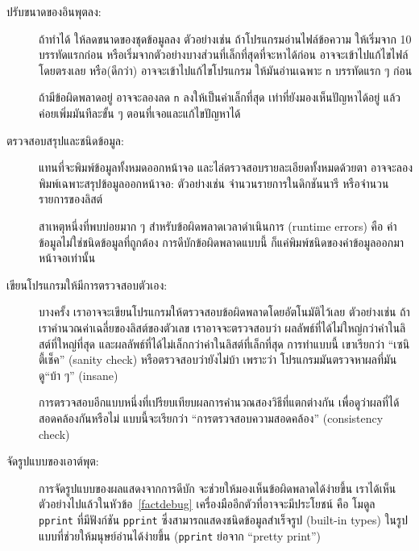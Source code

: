 \begin{description}

\item[ปรับขนาดของอินพุตลง:] 
ถ้าทำได้ ให้ลดขนาดของชุดข้อมูลลง
ตัวอย่างเช่น ถ้าโปรแกรมอ่านไฟล์ข้อความ
ให้เริ่มจาก 10 บรรทัดแรกก่อน หรือเริ่มจากตัวอย่างบางส่วนที่เล็กที่สุดที่จะหาได้ก่อน
อาจจะเข้าไปแก้ไขไฟล์โดยตรงเลย หรือ(ดีกว่า) อาจจะเข้าไปแก้ไขโปรแกรม ให้มันอ่านเฉพาะ \texttt{n} บรรทัดแรก ๆ ก่อน 

ถ้ามีข้อผิดพลาดอยู่ อาจจะลองลด \texttt{n} ลงให้เป็นค่าเล็กที่สุด เท่าที่ยังมองเห็นปัญหาได้อยู่
แล้วค่อยเพิ่มมันทีละขั้น ๆ ตอนที่เจอและแก้ไขปัญหาได้

\item[ตรวจสอบสรุปและชนิดข้อมูล:] 
แทนที่จะพิมพ์ข้อมูลทั้งหมดออกหน้าจอ และไล่ตรวจสอบรายละเอียดทั้งหมดด้วยตา
อาจจะลองพิมพ์เฉพาะสรุปข้อมูลออกหน้าจอ: 
ตัวอย่างเช่น
จำนวนรายการในดิกชันนารี หรือจำนวนรายการของลิสต์

สาเหตุหนึ่งที่พบบ่อยมาก ๆ สำหรับข้อผิดพลาดเวลาดำเนินการ (runtime errors) คือ ค่าข้อมูลไม่ใช่ชนิดข้อมูลที่ถูกต้อง
การดีบักข้อผิดพลาดแบบนี้ ก็แค่พิมพ์ชนิดของค่าข้อมูลออกมาหน้าจอเท่านั้น

\item[เขียนโปรแกรมให้มีการตรวจสอบตัวเอง:]  
บางครั้ง เราอาจจะเขียนโปรแกรมให้ตรวจสอบข้อผิดพลาดโดยอัตโนมัติไว้เลย
ตัวอย่างเช่น ถ้าเราคำนวณค่าเฉลี่ยของลิสต์ของตัวเลข
เราอาจจะตรวจสอบว่า ผลลัพธ์ที่ได้ไม่ใหญ่กว่าค่าในลิสต์ที่ใหญ่ที่สุด และผลลัพธ์ที่ได้ไม่เล็กกว่าค่าในลิสต์ที่เล็กที่สุด
การทำแบบนี้ เขาเรียกว่า ``เซนิตี้เช็ค'' (sanity check) หรือตรวจสอบว่ายังไม่บ้า
เพราะว่า โปรแกรมมันตรวจหาผลที่มันดู``บ้า ๆ'' (insane)

การตรวจสอบอีกแบบหนึ่งที่เปรียบเทียบผลการคำนวณสองวิธีที่แตกต่างกัน เพื่อดูว่าผลที่ได้สอดคล้องกันหรือไม่
แบบนี้จะเรียกว่า ``การตรวจสอบความสอดคล้อง'' (consistency check)

\item[จัดรูปแบบของเอาต์พุต:] การจัดรูปแบบของผลแสดงจากการดีบัก จะช่วยให้มองเห็นข้อผิดพลาดได้ง่ายขึ้น
เราได้เห็นตัวอย่างไปแล้วในหัวข้อ~\ref{factdebug} 
เครื่องมืออีกตัวที่อาจจะมีประโยชน์ คือ โมดูล \texttt{pprint} ที่มีฟังก์ชัน \texttt{pprint} ซึ่งสามารถแสดงชนิดข้อมูลสำเร็จรูป (built-in types) ในรูปแบบที่ช่วยให้มนุษย์อ่านได้ง่ายขึ้น
(\texttt{pprint} ย่อจาก ``pretty print'')

\end{description}


